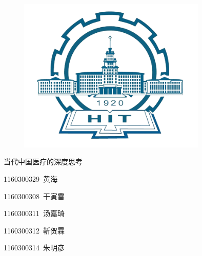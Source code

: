 \documentclass[11pt,twoside,a4paper]{article}
\begin{document}
	\begin{figure}[h]
		\centering
		\includegraphics[width=0.8\textwidth]{graph/logo.png}\\
	\end{figure}
\thispagestyle{empty}
\begin{center}
	\doublespacing
	\huge 当代中国医疗的深度思考
	
	\Large 1160300329\ 黄海 
	
	\Large 1160300308\ 干寅雷
	
	\Large 1160300311\ 汤嘉琦
	
	\Large 1160300312\ 靳贺霖
	
	\Large 1160300314\ 朱明彦
\end{center}
	\singlespacing
%	
	\newpage
	\pagestyle{fancy}
	\thispagestyle{fancy}
	\chead{}
	\lfoot{}
	\cfoot{}
	\rfoot{\thepage}
	
\end{document}
